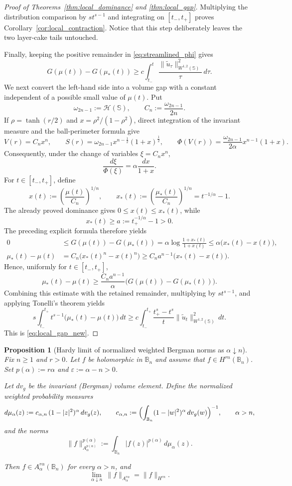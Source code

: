 \documentclass[11pt]{amsart}
\theoremstyle{plain}
\newtheorem{proposition}[theorem]{Proposition}
\theoremstyle{definition}
\theoremstyle{remark}
\newcommand{\B}{\mathbb{B}}
\newcommand{\Sph}{\mathbb{S}}
\begin{document}
\begin{proof}[Proof of Theorems~\ref{thm:local_dominance} and \ref{thm:local_gap}]
Multiplying the distribution comparison by $s t^{s-1}$ and integrating on
$[t_-,t_+]$ proves Corollary~\ref{cor:local_contraction}.  Notice that this
step deliberately leaves the two layer-cake tails untouched.

Finally, keeping the positive remainder in \eqref{eq:streamlined_phi} gives
\[
G(\mu(t))-G(\mu_*(t))\ge c\int_{t_-}^{t}
\frac{\|\widetilde u_\tau\|_{W^{1,2}(\Sph)}^2}{\tau}\,d\tau.
\]
We next convert the left-hand side into a volume gap with a constant independent
of a possible small value of $\mu(t)$. Put
\[
\omega_{2n-1}:=\mathcal H(\Sph),\qquad C_n:=\frac{\omega_{2n-1}}{2n}.
\]
If $\rho=\tanh(r/2)$ and $x=\rho^2/(1-\rho^2)$, direct integration of the
invariant measure and the ball-perimeter formula give
\[
V(r)=C_nx^n,
\qquad
S(r)=\omega_{2n-1}x^{n-\frac12}(1+x)^{\frac12},
\qquad
\Phi(V(r))=\frac{\omega_{2n-1}}{2\alpha}x^{n-1}(1+x).
\]
Consequently, under the change of variables $\xi=C_nx^n$,
\[
\frac{d\xi}{\Phi(\xi)}=\alpha\frac{dx}{1+x}.
\]
For $t\in[t_-,t_+]$, define
\[
x(t):=\left(\frac{\mu(t)}{C_n}\right)^{1/n},
\qquad
x_*(t):=\left(\frac{\mu_*(t)}{C_n}\right)^{1/n}
=t^{-1/\alpha}-1.
\]
The already proved dominance gives $0\le x(t)\le x_*(t)$, while
\[
x_*(t)\ge a:=t_+^{-1/\alpha}-1>0.
\]
The preceding explicit formula therefore yields
\begin{align*}
0&\le G(\mu(t))-G(\mu_*(t))
=\alpha\log\frac{1+x_*(t)}{1+x(t)}
\le\alpha\bigl(x_*(t)-x(t)\bigr),\\
\mu_*(t)-\mu(t)
&=C_n\bigl(x_*(t)^n-x(t)^n\bigr)
\ge C_na^{n-1}\bigl(x_*(t)-x(t)\bigr).
\end{align*}
Hence, uniformly for $t\in[t_-,t_+]$,
\[
\mu_*(t)-\mu(t)
\ge \frac{C_na^{n-1}}{\alpha}
\bigl(G(\mu(t))-G(\mu_*(t))\bigr).
\]
Combining this estimate with the retained remainder, multiplying by
$s t^{s-1}$, and applying Tonelli's theorem yields
\[
s\int_{t_-}^{t_+}t^{s-1}\bigl(\mu_*(t)-\mu(t)\bigr)\,dt
\ge c\int_{t_-}^{t_+}\frac{t_+^s-t^s}{t}
\|\widetilde u_t\|_{W^{1,2}(\Sph)}^2\,dt.
\]
This is \eqref{eq:local_gap_new}.
\end{proof}

\begin{proposition}[Hardy limit of normalized weighted Bergman norms as $\alpha\downarrow n$]
\label{prop:bergman_to_hardy_limit}
Fix $n\ge1$ and $r>0$. Let $f$ be holomorphic in $\B_n$ and assume that
$f\in H^{rn}(\B_n)$.
Set $p(\alpha):=r\alpha$ and $\varepsilon:=\alpha-n>0$.

Let $dv_g$ be the invariant (Bergman) volume element. Define the normalized weighted probability measures
\[
d\mu_\alpha(z):=c_{\alpha,n}\,(1-|z|^2)^{\alpha}\,dv_g(z),
\qquad
c_{\alpha,n}:=\Bigl(\int_{\B_n}(1-|w|^2)^{\alpha}\,dv_g(w)\Bigr)^{-1},
\qquad \alpha>n,
\]
and the norms
\[
\|f\|_{A_\alpha^{p(\alpha)}}^{p(\alpha)}
:=\int_{\B_n} |f(z)|^{p(\alpha)}\,d\mu_\alpha(z).
\]

Then $f\in A_\alpha^{r\alpha}(\B_n)$ for every $\alpha>n$, and
\[
\lim_{\alpha\downarrow n}\ \|f\|_{A_\alpha^{r\alpha}}
=
\|f\|_{H^{rn}}.
\]
\end{proposition}
\end{document}
